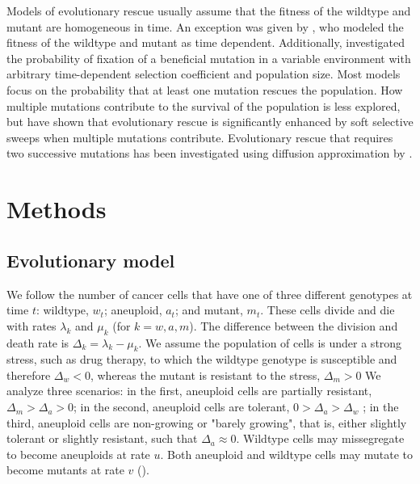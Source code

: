 \documentclass[12pt]{extarticle}
\begin{document}
Models of evolutionary rescue usually assume that the fitness of the wildtype and mutant are homogeneous in time. An exception was given by \citet{marrec2020adapt}, who modeled the fitness of the wildtype and mutant as time dependent. Additionally, \citet{uecker2011fixation} investigated the probability of fixation of a beneficial mutation in a variable environment with arbitrary time-dependent selection coefficient and population size.
Most models focus on the probability that at least one mutation rescues the population. How multiple mutations contribute to the survival of the population is less explored, but \citet{wilson2017soft} have shown that evolutionary rescue is significantly enhanced by soft selective sweeps when multiple mutations contribute. 
Evolutionary rescue that requires two successive mutations has been investigated using diffusion approximation by \citet{martin2013probability}.

\section*{Methods}
\subsection*{Evolutionary model}

We follow the number of cancer cells that have one of three different genotypes at time $t$: wildtype, $w_t$; aneuploid, $a_t$; and mutant, $m_t$. 
These cells divide and die with rates $\lambda_k$ and $\mu_k$ (for $k=w, a, m$).
The difference between the division and death rate is $\Delta_k = \lambda_k-\mu_k$.
We assume the population of cells is under a strong stress, such as drug therapy, to which the wildtype genotype is susceptible and therefore $\Delta_w<0$, whereas the mutant is resistant to the stress, $\Delta_m>0$
We analyze three scenarios: in the first, aneuploid cells are partially resistant, $\Delta_m>\Delta_a>0$; in the second, aneuploid cells are tolerant, $0>\Delta_a>\Delta_w$ \citep[see][for the distinction between susceptible, resistant, and tolerant]{brauner2016distinguishing}; in the third, aneuploid cells are non-growing or "barely growing", that is, either slightly tolerant or slightly resistant, such that $\Delta_a \approx 0$.
Wildtype cells may missegregate to become aneuploids at rate $u$. Both aneuploid and wildtype cells may mutate to become mutants at rate $v$ (). 
\end{document}
